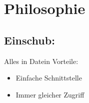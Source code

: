 \section[ph]{Philosophie}
\subsection{Einschub: }
\begin{frame}{Alles in Datein}
Vorteile:
\begin{itemize}
 \item Einfache Schnittstelle
 \item Immer gleicher Zugriff 
\end{itemize}

\end{frame}

